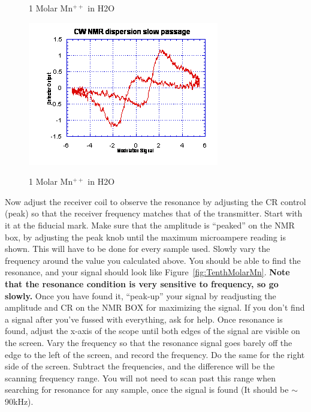 \documentclass{../lab}
\begin{document}
\begin{enumerate}
\begin{figure}[h]
\begin{minipage}[t]{0.32\textwidth}
        \caption{1 Molar Mn$^{++}$ in H2O}
    \end{minipage}\hfill
    \begin{minipage}[t]{0.32\textwidth}
        \href{http://experimentationlab.berkeley.edu/sites/default/files/images/NMR23.gif}{\includegraphics[width=\linewidth,keepaspectratio]{images/NMR23.png}}
        \caption{1 Molar Mn$^{++}$ in H2O}
        \label{fig:onemolar}
    \end{minipage}
    \end{figure}

    Now adjust the receiver coil to observe the resonance by adjusting the CR control (peak) so that the receiver frequency matches that of the transmitter. Start with it at the fiducial mark. Make sure that the amplitude is ``peaked'' on the NMR box, by adjusting the peak knob until the maximum microampere reading is shown. This will have to be done for every sample used. Slowly vary the frequency around the value you calculated above. You should be able to find the resonance, and your signal should look like Figure~\ref{fig:TenthMolarMn}. \textbf{Note that the resonance condition is very sensitive to frequency, so go slowly.} Once you have found it, ``peak-up'' your signal by readjusting the amplitude and CR on the NMR BOX for maximizing the signal. If you don't find a signal after you've fussed with everything, ask for help. Once resonance is found, adjust the x-axis of the scope until both edges of the signal are visible on the screen. Vary the frequency so that the resonance signal goes barely off the edge to the left of the screen, and record the frequency. Do the same for the right side of the screen. Subtract the frequencies, and the difference will be the scanning frequency range. You will not need to scan past this range when searching for resonance for any sample, once the signal is found (It should be $\sim$90kHz).
    

\end{enumerate}
\end{document}
